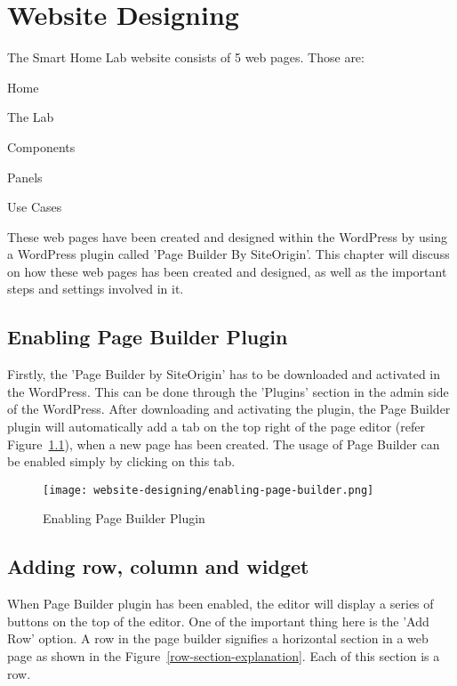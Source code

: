 \chapter{Website Designing}
The Smart Home Lab website consists of 5 web pages. Those are:
\begin{itemize*}
\item Home
\item The Lab
\item Components
\item Panels
\item Use Cases
\end{itemize*}

These web pages have been created and designed within the WordPress \cite{Williams.2015} by using a WordPress plugin called 'Page Builder By SiteOrigin'. This chapter will discuss on how these web pages has been created and designed, as well as the important steps and settings involved in it.

\section{Enabling Page Builder Plugin}
Firstly, the 'Page Builder by SiteOrigin' \cite{SiteOrigin.2016, SiteOrigin.2014} has to be downloaded and activated in the WordPress. This can be done through the 'Plugins' section in the admin side of the WordPress. After downloading and activating the plugin, the Page Builder plugin will automatically add a tab on the top right of the page editor (refer Figure~\ref{enabling-page-builder}), when a new page has been created. The usage of Page Builder can be enabled simply by clicking on this tab.

\begin{figure}[ht]
\centering
\caption{Enabling Page Builder Plugin}
\label{enabling-page-builder}
\texttt{[image: website-designing/enabling-page-builder.png]}
\end{figure}

\section{Adding row, column and widget}
When Page Builder plugin has been enabled, the editor will display a series of buttons on the top of the editor. One of the important thing here is the 'Add Row' option. A row in the page builder signifies a horizontal section in a web page as shown in the Figure~\ref{row-section-explanation}. Each of this section is a row.

